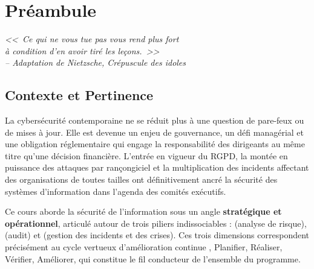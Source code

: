 
\chapter*{Préambule}

\begin{flushright}
    \itshape
    <<~Ce qui ne vous tue pas vous rend plus fort\\
    à condition d'en avoir tiré les leçons.~>>\\[0.5ex]
    \small-- Adaptation de Nietzsche, \textit{Crépuscule des idoles}
\end{flushright}

\vspace{1.5ex}

\section*{Contexte et Pertinence}

La cybersécurité contemporaine ne se réduit plus à une question de pare-feux ou de mises à jour. Elle est devenue un enjeu de gouvernance, un défi managérial et une obligation réglementaire qui engage la responsabilité des dirigeants au même titre qu'une décision financière. L'entrée en vigueur du RGPD, la montée en puissance des attaques par rançongiciel et la multiplication des incidents affectant des organisations de toutes tailles ont définitivement ancré la sécurité des systèmes d'information dans l'agenda des comités exécutifs.

Ce cours aborde la sécurité de l'information sous un angle \textbf{stratégique et opérationnel}, articulé autour de trois piliers indissociables :  (analyse de risque),  (audit) et  (gestion des incidents et des crises). Ces trois dimensions correspondent précisément au cycle vertueux d'amélioration continue , Planifier, Réaliser, Vérifier, Améliorer, qui constitue le fil conducteur de l'ensemble du programme.


